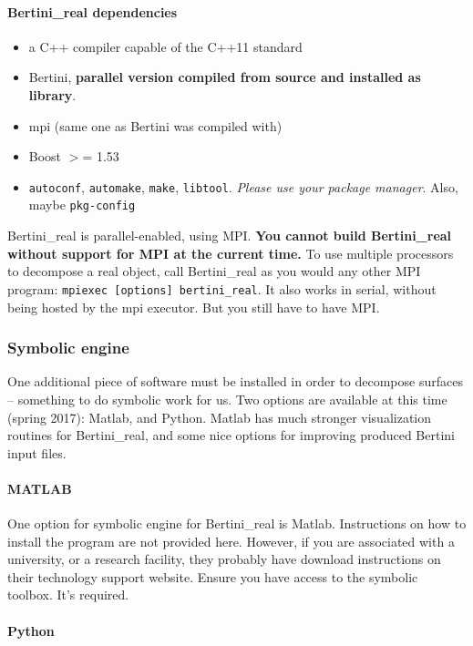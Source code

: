 \paragraph{Bertini\_real dependencies}

\begin{itemize}[noitemsep]
\item a C++ compiler capable of the C++11 standard
\item Bertini, {\bf parallel version compiled from source and installed as library}.
\item \gls{mpi} (same one as Bertini was compiled with)
\item Boost $>$= 1.53
\item {\tt autoconf}, {\tt automake}, {\tt make}, {\tt libtool}.  {\em Please use your package manager}.  Also, maybe {\tt pkg-config}
\end{itemize} 



Bertini\_real is parallel-enabled, using MPI.  {\bf You cannot build Bertini\_real without support for MPI at the current time.}  To use multiple processors to decompose a real object, call Bertini\_real as you would any other MPI program: \texttt{mpiexec [options] bertini\_real}.  It also works in serial, without being hosted by the mpi executor.  But you still have to have MPI.  


\subsubsection{Symbolic engine}

One additional piece of software must be installed in order to decompose surfaces -- something to do symbolic work for us.  Two options are available at this time (spring 2017):  Matlab, and Python.  Matlab has much stronger visualization routines for Bertini\_real, and some nice options for improving produced Bertini input files.

	\paragraph*{MATLAB}
One option for symbolic engine for Bertini\_real is Matlab.  Instructions on how to install the program are not provided here. However, if you are associated with a university, or a research facility, they probably have download instructions on their technology support website.   Ensure you have access to the symbolic toolbox.  It's required.

\paragraph*{Python}

